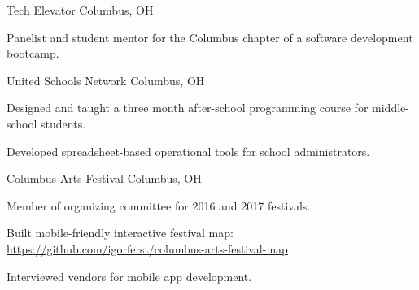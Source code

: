 

\begin{cventries}

  \cventryshort
    {Tech Elevator} %
    {Columbus, OH} %
    {
      \begin{cvitems} %
        \item {Panelist and student mentor for the Columbus chapter of a software development bootcamp.}
      \end{cvitems}
    }

  \cventryshort
    {United Schools Network} %
    {Columbus, OH} %
    {
      \begin{cvitems} %
        \item {Designed and taught a three month after-school programming course for middle-school students.}
        \item {Developed spreadsheet-based operational tools for school administrators.}
      \end{cvitems}
    }

  \cventryshort
    {Columbus Arts Festival} %
    {Columbus, OH} %
    {
      \begin{cvitems} %
        \item {Member of organizing committee for 2016 and 2017 festivals.}
        \item {Built mobile-friendly interactive festival map: \url{https://github.com/igorferst/columbus-arts-festival-map}}
        \item {Interviewed vendors for mobile app development.}
      \end{cvitems}
    }

\end{cventries}
